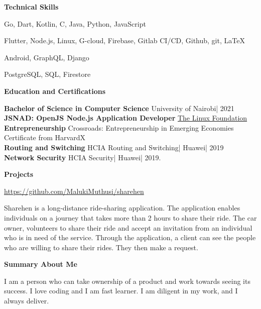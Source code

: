\documentclass[a4paper]{article}
\begin{document}
\begin{center}
    {\Large \textbf{Technical Skills}}
\end{center}

\begin{description}[noitemsep]
    \item[Languages:] Go, Dart, Kotlin, C, Java, Python, JavaScript
    \item[Platforms and tools:] Flutter, Node.js, Linux, G-cloud, Firebase, Gitlab CI/CD, Github, git, \LaTeX
    \item[Frameworks:] Android, GraphQL, Django
    \item[Databases:] PostgreSQL, SQL, Firestore
\end{description}

\begin{center}
    {\Large \textbf{Education and Certifications}}
\end{center}

\textbf{Bachelor of Science in Computer Science} University of Nairobi| 2021 \\
\textbf{JSNAD: OpenJS Node.js Application Developer} \href{https://www.credly.com/badges/ab918a14-4dfd-4800-be45-a6a3a8fbd96c/linked_in}{The Linux Foundation} \\
\textbf{Entrepreneurship} Crossroads: Entrepreneurship in Emerging Economies Certificate from HarvardX \\
\textbf{Routing and Switching} HCIA Routing and Switching| Huawei| 2019 \\
\textbf{Network Security} HCIA Security| Huawei| 2019. \par

\begin{center}
    {\Large \textbf{Projects}}
\end{center}

\centering \href{https://github.com/MalukiMuthusi/sharehen}{https://github.com/MalukiMuthusi/sharehen}


Sharehen is a long-distance ride-sharing application. The application enables individuals on a journey that takes more than 2 hours to share their ride. The car owner, volunteers to share their ride and accept an invitation from an individual who is in need of the service. Through the application, a client can see the people who are willing to share their rides. They then make a request.





\begin{center}
    {\Large \textbf{Summary About Me}}
\end{center}

I am a person who can take ownership of a product and work towards seeing its success. I love coding and I am fast learner. I am diligent in my work, and I always deliver.

\end{document}
